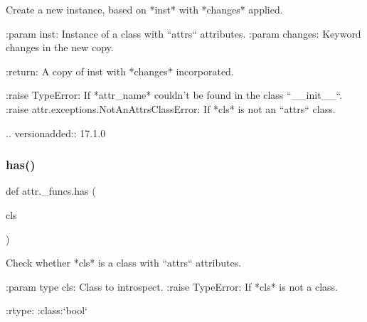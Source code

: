 \begin{DoxyVerb}Create a new instance, based on *inst* with *changes* applied.

:param inst: Instance of a class with ``attrs`` attributes.
:param changes: Keyword changes in the new copy.

:return: A copy of inst with *changes* incorporated.

:raise TypeError: If *attr_name* couldn't be found in the class
    ``__init__``.
:raise attr.exceptions.NotAnAttrsClassError: If *cls* is not an ``attrs``
    class.

..  versionadded:: 17.1.0
\end{DoxyVerb}
 \mbox{\label{namespaceattr_1_1__funcs_adbd5a4d35a456dd0c65876b5d01bf1cd}} 
\subsubsection{\texorpdfstring{has()}{has()}}
{\footnotesize\ttfamily def attr.\+\_\+funcs.\+has (\begin{DoxyParamCaption}\item[{}]{cls }\end{DoxyParamCaption})}

\begin{DoxyVerb}Check whether *cls* is a class with ``attrs`` attributes.

:param type cls: Class to introspect.
:raise TypeError: If *cls* is not a class.

:rtype: :class:`bool`
\end{DoxyVerb}
 